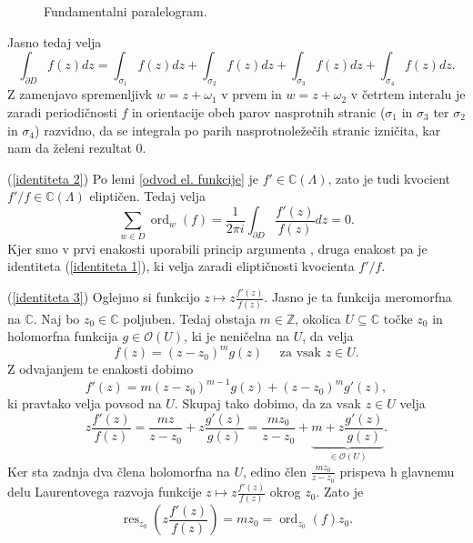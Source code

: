 \documentclass[mat1]{fmfdelo}
\newcommand{\Z}{\mathbb Z}
\newcommand{\C}{\mathbb C}
\newcommand{\om}{\omega}
\newcommand{\elf}{\C(\Lambda)}
\newcommand{\ord}[2]{\operatorname{ord}_{#1}(#2)}
\newcommand{\hol}[1]{\mathcal{O}(#1)}
\theoremstyle{definition}
\begin{document}
\begin{dokaz}
\begin{figure}[H]
        \caption{Fundamentalni paralelogram.}
        \label{fundamentalni paralelogram}
    \end{figure}


    Jasno tedaj velja
    \[
        \int_{\partial D} f(z)dz = \int_{\sigma_1} f(z)dz + \int_{\sigma_2} f(z)dz + \int_{\sigma_3} f(z)dz + \int_{\sigma_4} f(z)dz.
    \]
    Z zamenjavo spremenljivk $w = z + \om_1$ v prvem in $w = z + \om_2$ v četrtem interalu je zaradi periodičnosti $f$ in orientacije obeh parov nasprotnih stranic ($\sigma_1$ in $\sigma_3$ ter $\sigma_2$ in $\sigma_4$) razvidno, da se integrala po parih nasprotnoležečih stranic izničita, kar nam da želeni rezultat $0$.
    \\
    \par
    (\ref{identiteta 2}) Po lemi \ref{odvod el. funkcije} je $f' \in \elf$, zato je tudi kvocient $f'/f \in \elf$ eliptičen. Tedaj velja
    \[
        \sum_{w \in D} \ord{w}{f} = \frac{1}{2\pi i}\int_{\partial D} \frac{f'(z)}{f(z)}dz = 0. 
    \]
    Kjer smo v prvi enakosti uporabili princip argumenta \cite[Izrek 72]{Globevnik}, druga enakost pa je identiteta (\ref{identiteta 1}), ki velja zaradi eliptičnosti kvocienta $f'/f$.
    \\
    \par
    (\ref{identiteta 3}) Oglejmo si funkcijo $z \mapsto z \frac{f'(z)}{f(z)}$. Jasno je ta funkcija meromorfna na $\C$. Naj bo $z_0 \in \C$ poljuben. Tedaj obstaja $m \in \Z$, okolica $U \subseteq \C$ točke $z_0$ in holomorfna funkcija $g \in \hol{U}$, ki je neničelna na $U$, da velja
    \[
        f(z) = (z - z_0)^m g(z) \quad \text{ za vsak $z \in U$.}  
    \]
    Z odvajanjem te enakosti dobimo
    \[
        f'(z) = m(z - z_0)^{m - 1} g(z) + (z - z_0)^m g'(z),
    \]
    ki pravtako velja povsod na $U$. Skupaj tako dobimo, da za vsak $z \in U$ velja
    \[
        z\frac{f'(z)}{f(z)} = \frac{mz}{z-z_0} + z\frac{g'(z)}{g(z)} = \frac{mz_0}{z-z_0} + \underbrace{m + z\frac{g'(z)}{g(z)}}_{\in \hol{U}}.
    \]
    Ker sta zadnja dva člena holomorfna na $U$, edino člen $\frac{mz_0}{z-z_0}$ prispeva h glavnemu delu Laurentovega razvoja funkcije $z \mapsto z \frac{f'(z)}{f(z)}$ okrog $z_0$. Zato je 
    \[
        \operatorname{res}_{z_0} \left( z \frac{f'(z)}{f(z)} \right) = mz_0 = \ord{z_0}{f}z_0.  
\]
\end{dokaz}
\end{document}
